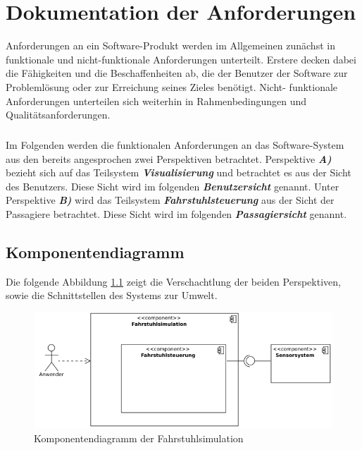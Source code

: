 \chapter{Dokumentation der Anforderungen}
Anforderungen an ein Software-Produkt werden im Allgemeinen zunächst in funktionale und nicht-funktionale Anforderungen unterteilt. Erstere decken dabei die Fähigkeiten und die Beschaffenheiten ab, die der Benutzer der Software zur Problemlösung oder zur Erreichung seines Zieles benötigt. Nicht- funktionale Anforderungen unterteilen sich weiterhin in Rahmenbedingungen und Qualitätsanforderungen.

\paragraph{}
Im Folgenden werden die funktionalen Anforderungen an das Software-System aus den bereits angesprochen zwei Perspektiven betrachtet. Perspektive \textit{\textbf{A)}} bezieht sich auf das Teilsystem \textit{\textbf{\gls{Visualisierung}}} und betrachtet es aus der Sicht des Benutzers. Diese Sicht wird im folgenden \textit{\textbf{Benutzersicht}} genannt. Unter Perspektive \textit{\textbf{B)}} wird das Teilsystem \textit{\textbf{\gls{Fahrstuhlsteuerung}}} aus der Sicht der Passagiere betrachtet. Diese Sicht wird im folgenden \textit{\textbf{Passagiersicht}} genannt.

\newpage
\section{Komponentendiagramm}
Die folgende Abbildung \ref{fig:komponentendiagramm} zeigt die Verschachtlung der beiden Perspektiven, sowie die Schnittstellen des Systems zur Umwelt.

\vspace{0,5cm}

\begin{figure}[hbt]
	\includegraphics[width=\textwidth]{images/komponentendiagramm.png}
	\caption{Komponentendiagramm der \gls{Fahrstuhlsimulation}}
	\label{fig:komponentendiagramm}
\end{figure}


